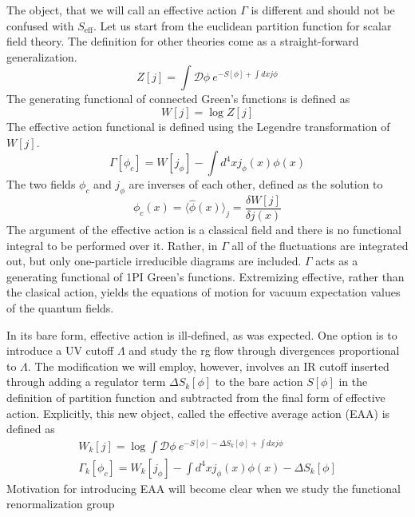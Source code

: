\documentclass[11pt, a4paper]{article}
\begin{document}
The object, that we will call an effective action $\Gamma$ is different and should not be confused with $S_{\text{eff}}$.
Let us start from the euclidean partition function for scalar field theory. The definition for other theories
come as a straight-forward generalization.
\begin{equation}
    Z[j] = \int \mathcal{D}\phi \ e^{-S[\phi] + \int dx j \phi}
\end{equation}
The generating functional of connected Green's functions is defined as
\begin{equation}
    W[j] = \log{Z[j]}
\end{equation}
The effective action functional is defined using the Legendre transformation of $W[j]$.
\begin{equation}
    \Gamma[\phi_c] = W[j_\phi] - \int d^4 x j_\phi(x) \phi(x)
\end{equation}
The two fields $\phi_c$ and $j_\phi$ are inverses of each other, defined as the solution to
\begin{equation}
    \phi_c(x) = \langle \hat\phi (x) \rangle_j = \frac{\delta W[j]}{\delta j(x)}
\end{equation}
The argument of the effective action is a classical field and there is no functional integral to be performed over it.
Rather, in $\Gamma$ all of the fluctuations are integrated out, but only one-particle irreducible diagrams
are included. $\Gamma$ acts as a generating functional of 1PI Green's functions. Extremizing effective, rather than
the clasical action, yields the equations of motion for vacuum expectation values of the quantum fields.

In its bare form, effective action is ill-defined, as was expected. One option is to introduce a UV cutoff $\Lambda$
and study the rg flow through divergences proportional to $\Lambda$. The modification we will employ, however, involves
an IR cutoff inserted through adding a regulator term $\Delta S_k[\phi]$ to the bare action $S[\phi]$ in the definition of partition function
and subtracted from the final form of effective action. Explicitly, this new object, called the effective average action (EAA) is defined as
\begin{gather}
    W_k[j] = \log{\int \mathcal{D}\phi \ e^{-S[\phi] - \Delta S_k[\phi] + \int dx j \phi}}\\
    \Gamma_k[\phi_c] = W_k[j_\phi] - \int d^4 x j_\phi(x) \phi(x) - \Delta S_k[\phi]
\end{gather}
Motivation for introducing EAA will become clear when we study the functional renormalization group
\end{document}

